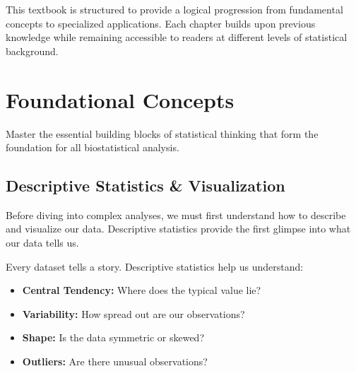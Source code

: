 \documentclass[
  11pt,
  letterpaper,
  oneside]{book}
\providecommand{\tightlist}{%
  \setlength{\itemsep}{0pt}\setlength{\parskip}{0pt}}\usepackage{longtable,booktabs,array}
\begin{document}
This textbook is structured to provide a logical progression from
fundamental concepts to specialized applications. Each chapter builds
upon previous knowledge while remaining accessible to readers at
different levels of statistical background.


\chapter{Foundational Concepts}\label{foundational-concepts}

Master the essential building blocks of statistical thinking that form
the foundation for all biostatistical analysis.

\section{Descriptive Statistics \&
Visualization}\label{descriptive-statistics-visualization}

Before diving into complex analyses, we must first understand how to
describe and visualize our data. Descriptive statistics provide the
first glimpse into what our data tells us.

\begin{tcolorbox}[enhanced jigsaw, left=2mm, opacityback=0, titlerule=0mm, leftrule=.75mm, colbacktitle=quarto-callout-note-color!10!white, title=\textcolor{quarto-callout-note-color}{\faInfo}\hspace{0.5em}{Understanding Your Data}, breakable, opacitybacktitle=0.6, rightrule=.15mm, colframe=quarto-callout-note-color-frame, toprule=.15mm, bottomrule=.15mm, bottomtitle=1mm, toptitle=1mm, coltitle=black, arc=.35mm, colback=white]

Every dataset tells a story. Descriptive statistics help us understand:

\begin{itemize}
\tightlist
\item
  \textbf{Central Tendency:} Where does the typical value lie?
\item
  \textbf{Variability:} How spread out are our observations?
\item
  \textbf{Shape:} Is the data symmetric or skewed?
\item
  \textbf{Outliers:} Are there unusual observations?
\end{itemize}

\end{tcolorbox}
\end{document}

